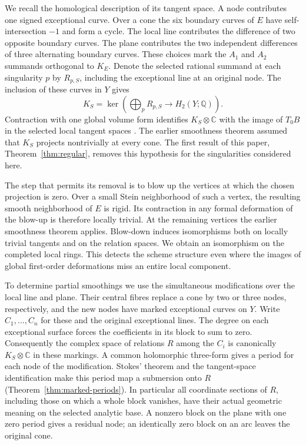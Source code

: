 \documentclass[11pt]{amsart}
\theoremstyle{definition}\newtheorem{example}[theorem]{Example}
\theoremstyle{remark}\newtheorem{remark}[theorem]{Remark}
\newcommand{\CC}{\mathbb C}
\newcommand{\QQ}{\mathbb Q}
\begin{document}
We recall the homological description of its tangent space.
A node contributes one signed exceptional curve. Over a cone the six
boundary curves of $E$ have self-intersection $-1$ and form a cycle.
The local line contributes the difference of two opposite boundary
curves. The plane contributes the two independent differences of
three alternating boundary curves. These choices mark the $A_1$ and
$A_2$ summands orthogonal to $K_E$. Denote the selected rational summand
at each singularity $p$ by $R_{p,S}$, including the exceptional line
at an original node. The inclusion of these curves in $Y$ gives
\[
 K_S=\ker\!\left(\bigoplus_p R_{p,S}\longrightarrow H_2(Y;\QQ)\right).
\]
Contraction with one global volume form identifies $K_S\otimes\CC$
with the image of $T_0B$ in the selected local tangent spaces
\cite[Lemma~4.4 and Theorem~4.5]{W5}. The earlier smoothness theorem
assumed that $K_S$ projects nontrivially at every cone. The first result
of this paper, Theorem~\ref{thm:regular}, removes this hypothesis for
the singularities considered here.

The step that permits its removal is to blow up the vertices at which
the chosen projection is zero. Over a small Stein neighborhood of such
a vertex, the resulting smooth neighborhood of $E$ is rigid. Its
contraction in any formal deformation of the blow-up is therefore locally
trivial. At the remaining vertices the earlier smoothness theorem
applies. Blow-down induces isomorphisms both on locally trivial tangents
and on the relation spaces. We obtain an isomorphism on the completed
local rings. This detects the scheme structure even where the images
of global first-order deformations miss an entire local component.

To determine partial smoothings we use the simultaneous modifications
over the local line and plane. Their central fibres replace a cone by
two or three nodes, respectively, and the new nodes have marked
exceptional curves on $Y$. Write $C_1,\ldots,C_n$ for these and the
original exceptional lines. The degree on each exceptional surface
forces the coefficients in its block to sum to zero. Consequently the
complex space of relations $R$ among the $C_i$ is canonically
$K_S\otimes\CC$ in these markings. A common holomorphic three-form
gives a period for each node of the modification. Stokes' theorem and
the tangent-space identification make this period map a submersion
onto $R$ (Theorem~\ref{thm:marked-periods}). In particular all coordinate
sections of $R$, including those on which a whole block vanishes, have
their actual geometric meaning on the selected analytic base. A nonzero
block on the plane with one zero period gives a residual node; an
identically zero block on an arc leaves the original cone.
\end{document}

